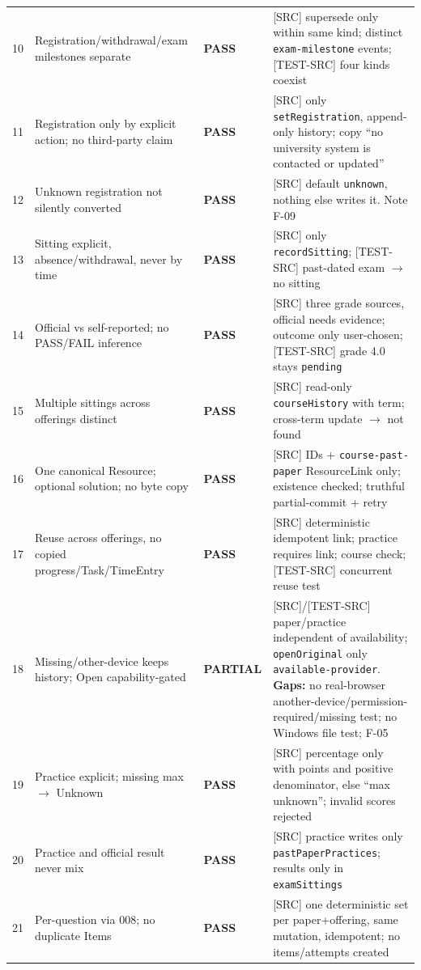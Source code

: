 \documentclass[11pt,a4paper]{article}
\newcommand{\PASS}{\textcolor{green!50!black}{\textbf{PASS}}}
\newcommand{\PART}{\textcolor{orange!80!black}{\textbf{PARTIAL}}}
\begin{document}
{\begin{longtable}{@{}p{0.5cm}p{4.3cm}p{1.6cm}p{9.3cm}@{}}
10 & Registration/withdrawal/exam milestones separate & \PASS & [SRC] supersede only within same kind; distinct \texttt{exam-milestone} events; [TEST-SRC] four kinds coexist \\
11 & Registration only by explicit action; no third-party claim & \PASS & [SRC] only \texttt{setRegistration}, append-only history; copy ``no university system is contacted or updated'' \\
12 & Unknown registration not silently converted & \PASS & [SRC] default \texttt{unknown}, nothing else writes it. Note F-09 \\
13 & Sitting explicit, absence/withdrawal, never by time & \PASS & [SRC] only \texttt{recordSitting}; [TEST-SRC] past-dated exam $\to$ no sitting \\
14 & Official vs self-reported; no PASS/FAIL inference & \PASS & [SRC] three grade sources, official needs evidence; outcome only user-chosen; [TEST-SRC] grade 4.0 stays \texttt{pending} \\
15 & Multiple sittings across offerings distinct & \PASS & [SRC] read-only \texttt{courseHistory} with term; cross-term update $\to$ not found \\
16 & One canonical Resource; optional solution; no byte copy & \PASS & [SRC] IDs + \texttt{course-past-paper} ResourceLink only; existence checked; truthful partial-commit + retry \\
17 & Reuse across offerings, no copied progress/Task/TimeEntry & \PASS & [SRC] deterministic idempotent link; practice requires link; course check; [TEST-SRC] concurrent reuse test \\
18 & Missing/other-device keeps history; Open capability-gated & \PART & [SRC]/[TEST-SRC] paper/practice independent of availability; \texttt{openOriginal} only \texttt{available-provider}. \textbf{Gaps:} no real-browser another-device/permission-required/missing test; no Windows file test; F-05 \\
19 & Practice explicit; missing max $\to$ Unknown & \PASS & [SRC] percentage only with points and positive denominator, else ``max unknown''; invalid scores rejected \\
20 & Practice and official result never mix & \PASS & [SRC] practice writes only \texttt{pastPaperPractices}; results only in \texttt{examSittings} \\
21 & Per-question via 008; no duplicate Items & \PASS & [SRC] one deterministic set per paper+offering, same mutation, idempotent; no items/attempts created \\

\end{longtable}}
\end{document}

